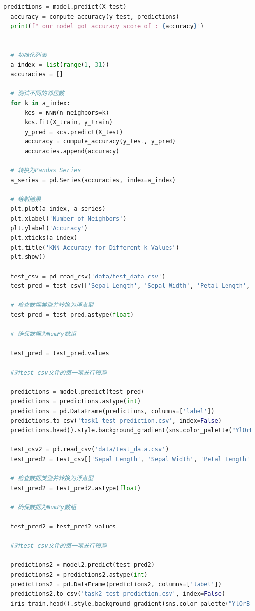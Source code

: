 \documentclass[12pt]{article}
\begin{document}
\begin{lstlisting}[language=Python]
  predictions = model.predict(X_test)
  accuracy = compute_accuracy(y_test, predictions)
  print(f" our model got accuracy score of : {accuracy}")   
  
  
  # 初始化列表
  a_index = list(range(1, 31))
  accuracies = []
  
  # 测试不同的邻居数
  for k in a_index:
      kcs = KNN(n_neighbors=k)
      kcs.fit(X_train, y_train)
      y_pred = kcs.predict(X_test)
      accuracy = compute_accuracy(y_test, y_pred)
      accuracies.append(accuracy)
  
  # 转换为Pandas Series
  a_series = pd.Series(accuracies, index=a_index)
  
  # 绘制结果
  plt.plot(a_index, a_series)
  plt.xlabel('Number of Neighbors')
  plt.ylabel('Accuracy')
  plt.xticks(a_index)
  plt.title('KNN Accuracy for Different k Values')
  plt.show()
  
  test_csv = pd.read_csv('data/test_data.csv')
  test_pred = test_csv[['Sepal Length', 'Sepal Width', 'Petal Length', 'Petal Width']]
  
  # 检查数据类型并转换为浮点型
  test_pred = test_pred.astype(float)
  
  # 确保数据为NumPy数组
  
  test_pred = test_pred.values
  
  #对test_csv文件的每一项进行预测
  
  predictions = model.predict(test_pred)
  predictions = predictions.astype(int)
  predictions = pd.DataFrame(predictions, columns=['label'])
  predictions.to_csv('task1_test_prediction.csv', index=False)
  predictions.head().style.background_gradient(sns.color_palette("YlOrBr", as_cmap=True))
  
  test_csv2 = pd.read_csv('data/test_data.csv')
  test_pred2 = test_csv[['Sepal Length', 'Sepal Width', 'Petal Length', 'Petal Width']]
  
  # 检查数据类型并转换为浮点型
  test_pred2 = test_pred2.astype(float)
  
  # 确保数据为NumPy数组
  
  test_pred2 = test_pred2.values
  
  #对test_csv文件的每一项进行预测
  
  predictions2 = model2.predict(test_pred2)
  predictions2 = predictions2.astype(int)
  predictions2 = pd.DataFrame(predictions2, columns=['label'])
  predictions2.to_csv('task2_test_prediction.csv', index=False)
  iris_train.head().style.background_gradient(sns.color_palette("YlOrBr", as_cmap=True))
  

\end{lstlisting}
\end{document}
